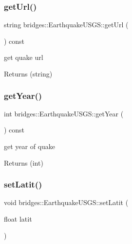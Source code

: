 \subsubsection{\texorpdfstring{getUrl()}{getUrl()}}
{\footnotesize\ttfamily string bridges\+::\+Earthquake\+U\+S\+G\+S\+::get\+Url (\begin{DoxyParamCaption}{ }\end{DoxyParamCaption}) const\hspace{0.3cm}{\ttfamily [inline]}}

get quake url

\begin{DoxyReturn}{Returns}
(string) 
\end{DoxyReturn}
\mbox{\label{classbridges_1_1_earthquake_u_s_g_s_adb7b780eee3a8ac5907dd40e0a858eaf}} 
\subsubsection{\texorpdfstring{getYear()}{getYear()}}
{\footnotesize\ttfamily int bridges\+::\+Earthquake\+U\+S\+G\+S\+::get\+Year (\begin{DoxyParamCaption}{ }\end{DoxyParamCaption}) const\hspace{0.3cm}{\ttfamily [inline]}}

get year of quake

\begin{DoxyReturn}{Returns}
(int) 
\end{DoxyReturn}
\mbox{\label{classbridges_1_1_earthquake_u_s_g_s_a143678bb9dd697f82dcb260ddab78f82}} 
\subsubsection{\texorpdfstring{setLatit()}{setLatit()}}
{\footnotesize\ttfamily void bridges\+::\+Earthquake\+U\+S\+G\+S\+::set\+Latit (\begin{DoxyParamCaption}\item[{float}]{latit }\end{DoxyParamCaption})\hspace{0.3cm}{\ttfamily [inline]}}

